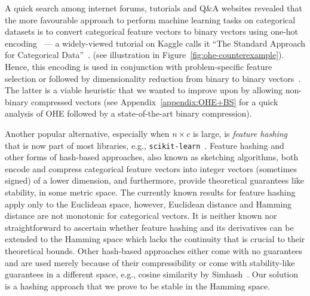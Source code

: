 A quick search among internet forums, tutorials and Q\&A websites revealed that the more favourable approach to perform machine learning tasks on categorical datasets is to convert categorical feature vectors to binary vectors using one-hot encoding~\cite[see DictVectorizer]{scikit-learn} --- a widely-viewed tutorial on Kaggle calls it ``The Standard Approach for Categorical Data''~\cite{kaggle_one_hot}.  (see illustration in Figure~\ref{fig:ohe-counterexample}). Hence, this encoding is used in conjunction with problem-specific feature selection or followed by dimensionality reduction from binary to binary vectors~\cite{ICDM,oddsketch,JS_BCS}. The latter is a viable heuristic that we wanted to improve upon by allowing non-binary compressed vectors (see Appendix~\ref{appendix:OHE+BS} for a quick analysis of OHE followed by a state-of-the-art binary compression).

Another popular alternative, especially when $n\times c$ is large, is {\em feature hashing}~\cite{WeinbergerDLSA09} that is now part of most libraries, e.g., {\tt scikit-learn}~\cite[see FeatureHasher]{scikit-learn}. Feature hashing and other forms of hash-based approaches, also known as sketching algorithms, both encode and compress categorical feature vectors into integer vectors (sometimes signed) of a lower dimension, and furthermore, provide theoretical guarantees like stability, in some metric space. The currently known results for feature hashing apply only to the Euclidean space, however, Euclidean distance and Hamming distance are not monotonic for categorical vectors. It is neither known nor straightforward to ascertain whether feature hashing and its derivatives can be extended to the Hamming space which lacks the continuity that is crucial to their theoretical bounds. Other hash-based approaches either come with no guarantees and are used merely because of their compressibility or come with stability-like guarantees in a different space, e.g., cosine similarity by Simhash~\cite{simhash}. Our solution is a hashing approach that we prove to be stable in the Hamming space.



